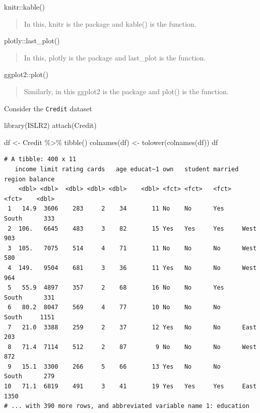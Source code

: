 \documentclass[
  letterpaper,
  DIV=11,
  numbers=noendperiod]{scrartcl}
\newenvironment{Shaded}{\begin{snugshade}}{\end{snugshade}}
\newcommand{\FunctionTok}[1]{\textcolor[rgb]{0.28,0.35,0.67}{#1}}
\newcommand{\NormalTok}[1]{\textcolor[rgb]{0.00,0.23,0.31}{#1}}
\newcommand{\OtherTok}[1]{\textcolor[rgb]{0.00,0.23,0.31}{#1}}
\newcommand{\SpecialCharTok}[1]{\textcolor[rgb]{0.37,0.37,0.37}{#1}}
\begin{document}
knitr::kable()

\begin{quote}
In this, knitr is the package and kable() is the function.
\end{quote}

plotly::last\_plot()

\begin{quote}
In this, plotly is the package and last\_plot is the function.
\end{quote}

ggplot2::plot()

\begin{quote}
Similarly, in this ggplot2 is the package and plot() is the function.
\end{quote}

Consider the \texttt{Credit} dataset

\begin{Shaded}
\begin{Highlighting}[]
\FunctionTok{library}\NormalTok{(ISLR2)}
\FunctionTok{attach}\NormalTok{(Credit)}

\NormalTok{df }\OtherTok{\textless{}{-}}\NormalTok{ Credit }\SpecialCharTok{\%\textgreater{}\%} \FunctionTok{tibble}\NormalTok{()}
\FunctionTok{colnames}\NormalTok{(df) }\OtherTok{\textless{}{-}} \FunctionTok{tolower}\NormalTok{(}\FunctionTok{colnames}\NormalTok{(df))}
\NormalTok{df}
\end{Highlighting}
\end{Shaded}

\begin{verbatim}
# A tibble: 400 x 11
   income limit rating cards   age educat~1 own   student married region balance
    <dbl> <dbl>  <dbl> <dbl> <dbl>    <dbl> <fct> <fct>   <fct>   <fct>    <dbl>
 1   14.9  3606    283     2    34       11 No    No      Yes     South      333
 2  106.   6645    483     3    82       15 Yes   Yes     Yes     West       903
 3  105.   7075    514     4    71       11 No    No      No      West       580
 4  149.   9504    681     3    36       11 Yes   No      No      West       964
 5   55.9  4897    357     2    68       16 No    No      Yes     South      331
 6   80.2  8047    569     4    77       10 No    No      No      South     1151
 7   21.0  3388    259     2    37       12 Yes   No      No      East       203
 8   71.4  7114    512     2    87        9 No    No      No      West       872
 9   15.1  3300    266     5    66       13 Yes   No      No      South      279
10   71.1  6819    491     3    41       19 Yes   Yes     Yes     East      1350
# ... with 390 more rows, and abbreviated variable name 1: education
\end{verbatim}
\end{document}

